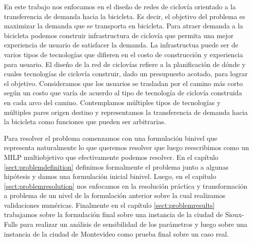  En este trabajo nos enfocamos en el diseño de redes de ciclovía orientado a la transferencia de demanda hacia la bicicleta. Es decir, el objetivo del problema es maximizar la demanda que se transporta en bicicleta. Para atraer demanda a la bicicleta podemos construir infrastructura de ciclovía que permita una mejor experiencia de usuario de satisfacer la demanda. La infrastructua puede ser de varios tipos de tecnologías que difieren en el costo de construcción y experiencia para usuario. El diseño de la red de ciclovías refiere a la planificación de dónde y cuales tecnologías de ciclovía construir, dado un presupuesto acotado, para lograr el objetivo. Consideramos que los usuarios se trasladan por el camino más corto según un costo que varía de acuerdo al tipo de tecnología de ciclovía construida en cada arco del camino. Contemplamos múltiples tipos de tecnologías y múltiples pares origen destino y representamos la transferencia de demanda hacia la bicicleta como funciones que pueden ser arbitrarias.

  Para resolver el problema comenzamos con una formulación binivel que representa naturalmente lo que queremos resolver que luego reescribimos como un MILP multiobjetivo que efectivamente podemos resolver. En el capítulo \ref{sect:problemdefinition} definimos formalmente el problema junto a algunas hipótesis y damos una formulación inicial binivel. Luego, en el capítulo \ref{sect:problemresolution} nos enfocamos en la resolución práctica y transformación a problema de un nivel de la formulación anterior sobre la cual realizamos validaciones numéricas. Finalmente en el capítulo \ref{sect:problemresults} trabajamos sobre la formulación final sobre una instancia de la ciudad de Sioux-Falls para realizar un análisis de sensibilidad de los parámetros y luego sobre una instancia de la ciudad de Montevideo como prueba final sobre un caso real.


